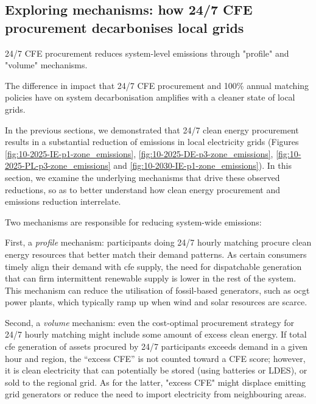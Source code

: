 \subsection{Exploring mechanisms: how 24/7 CFE procurement decarbonises local grids}
\label{subsec:mechanisms}

\vspace{10pt}
\begin{res}
    24/7 CFE procurement reduces system-level \co \newline
    emissions through "profile" and "volume" mechanisms. 
\end{res}

\vspace{5pt}
\begin{res}
    The difference in impact that 24/7 CFE procurement and 100\% annual matching policies have on system decarbonisation amplifies with a cleaner state of local grids. %
\end{res}

In the previous sections, we demonstrated that 24/7 clean energy procurement results in a substantial reduction of \co emissions in local electricity grids (Figures \ref{fig:10-2025-IE-p1-zone_emissions}, \ref{fig:10-2025-DE-p3-zone_emissions}, \ref{fig:10-2025-PL-p3-zone_emissions} and \ref{fig:10-2030-IE-p1-zone_emissions}).
In this section, we examine the underlying mechanisms that drive these observed reductions, so as to better understand how clean energy procurement and emissions reduction interrelate.

Two mechanisms are responsible for reducing system-wide emissions:

First, a \textit{profile} mechanism: participants doing 24/7 hourly matching procure clean energy resources that better match their demand patterns. 
As certain consumers timely align their demand with \gls{cfe} supply, the need for dispatchable generation that can firm intermittent renewable supply is lower in the rest of the system. 
This mechanism can reduce the utilisation of fossil-based generators, such as \gls{ocgt} power plants, which typically ramp up when wind and solar resources are scarce.

Second, a \textit{volume} mechanism: even the cost-optimal procurement strategy for 24/7 hourly matching might include some amount of excess clean energy.
If total \gls{cfe} generation of assets procured by 24/7 participants exceeds demand in a given hour and region, the “excess CFE” is not counted toward a CFE score; however, it is clean electricity that can potentially be stored (using batteries or LDES), or sold to the regional grid.
As for the latter, "excess CFE" might displace emitting grid generators or reduce the need to import electricity from neighbouring areas.

